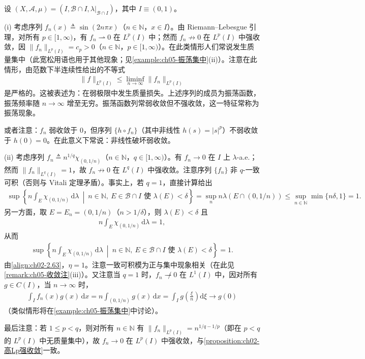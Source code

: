 \documentclass[../../main.tex]{subfiles}%
\begin{document}
\begin{example}\label{example:ch02-非线性弱星}
\label{example:ch02-弱收敛振荡}
设 $(X,\mathscr A,\mu)=(I,\mathscr B\cap I,\lambda|_{\mathscr B\cap I})$，其中 $I\equiv(0,1)$。

(i) 考虑序列 $f_n(x)\triangleq \sin(2n\pi x)$（$n\in\mathbb N$，$x\in I$）。由 Riemann--Lebesgue 引理，对所有 $p\in[1,\infty)$，有 $f_n\rightharpoonup0$ 在 $L^p(I)$ 中；然而 $f_n\not\to0$ 在 $L^p(I)$ 中强收敛，因 $\|f_n\|_{L^p(I)}=c_p>0$（$n\in\mathbb N$，$p\in[1,\infty)$）。在此类情形人们常说发生质量集中（此宽松用语也用于其他现象；见\cref{example:ch05-振荡集中}(ii)）。注意在此情形，由范数下半连续性给出的不等式
\begin{align*}
\|f\|_{L^p(I)}\leqslant\liminf_{n\to\infty}\|f_n\|_{L^p(I)}
\end{align*}
是严格的。这被表述为：在弱极限中发生质量损失。上述序列的成员为振荡函数，振荡频率随 $n\to\infty$ 增至无穷。振荡函数列常弱收敛但不强收敛，这一特征常称为振荡现象。

或者注意：$f_n$ 弱收敛于 $0$，但序列 $\{h\circ f_n\}$（其中非线性 $h(s)=|s|^p$）不弱收敛于 $h(0)=0$。在此意义下常说：非线性破坏弱收敛。

(ii) 考虑序列 $f_n\triangleq n^{1/q}\chi_{(0,1/n)}$（$n\in\mathbb N$，$q\in[1,\infty)$）。有 $f_n\to0$ 在 $I$ 上 $\lambda$-a.e.；然而 $\|f_n\|_{L^q(I)}=1$，故 $f_n\not\to0$ 在 $L^q(I)$ 中强收敛。注意序列 $\{f_n\}$ 非 $q$-一致可积（否则与 Vitali 定理矛盾）。事实上，若 $q=1$，直接计算给出
\begin{align*}
\sup\left\{n\int_E\chi_{(0,1/n)}\,\mathrm{d}\lambda\ \middle|\ n\in\mathbb N,\ E\in\mathscr B\cap I\text{ 使 }\lambda(E)<\delta\right\}
=\sup_n n\lambda(E\cap(0,1/n))\leqslant\sup_{n\in\mathbb N}\min\{n\delta,1\}=1.
\end{align*}
另一方面，取 $E=E_n=(0,1/n)$（$n>1/\delta$），则 $\lambda(E)<\delta$ 且
\begin{align*}
n\int_E\chi_{(0,1/n)}\,\mathrm{d}\lambda=1,
\end{align*}
从而
\begin{align*}
\sup\left\{n\int_E\chi_{(0,1/n)}\,\mathrm{d}\lambda\ \middle|\ n\in\mathbb N,\ E\in\mathscr B\cap I\text{ 使 }\lambda(E)<\delta\right\}=1.
\end{align*}
由\eqref{align:ch02-2.63}，$\eta=1$。注意一致可积模为正与集中现象相关（在此见\cref{remark:ch05-收敛注}(iii)）。又注意当 $q=1$ 时，$f_n\not\rightharpoonup0$ 在 $L^1(I)$ 中，因对所有 $g\in C(I)$，当 $n\to\infty$ 时，
\begin{align*}
\int_I f_n(x)g(x)\,\mathrm{d}x=n\int_{(0,1/n)}g(x)\,\mathrm{d}x=\int_I g\left(\frac{\xi}{n}\right)\mathrm{d}\xi\to g(0)
\end{align*}
（类似情形将在\cref{example:ch05-振荡集中}中讨论）。

最后注意：若 $1\leqslant p<q$，则对所有 $n\in\mathbb N$ 有 $\|f_n\|_{L^p(I)}=n^{1/q-1/p}$（即在 $p<q$ 的 $L^p(I)$ 中无质量集中），故 $f_n\to0$ 在 $L^p(I)$ 中强收敛，与\cref{proposition:ch02-高Lp强收敛}一致。
\end{example}
\end{document}
